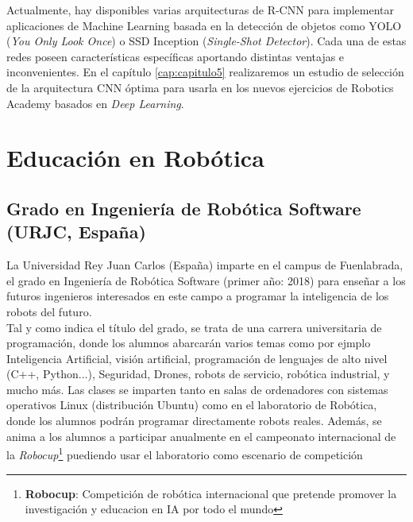 Actualmente, hay disponibles varias arquitecturas de R-CNN para implementar aplicaciones de Machine Learning basada en la detección de objetos como YOLO (\textit{You Only Look Once}) o SSD Inception (\textit{Single-Shot Detector}). Cada una de estas redes poseen características específicas aportando distintas ventajas e inconvenientes. En el capítulo \ref{cap:capitulo5} realizaremos un estudio de selección de la arquitectura CNN óptima para usarla en los nuevos ejercicios de Robotics Academy basados en \textit{Deep Learning}.


\section{Educación en Robótica}
\label{sec:educacion_robotica}

\subsection{Grado en Ingeniería de Robótica Software (URJC, España)}
\label{subsec:grado_robotica_software}
La Universidad Rey Juan Carlos (España) imparte en el campus de Fuenlabrada, el grado en Ingeniería de Robótica Software (primer año: 2018) para enseñar a los futuros ingenieros interesados en este campo a programar la inteligencia de los robots del futuro.\\

Tal y como indica el título del grado, se trata de una carrera universitaria de programación, donde los alumnos abarcarán varios temas como por ejmplo Inteligencia Artificial, visión artificial, programación de lenguajes de alto nivel (C++, Python...), Seguridad, Drones, robots de servicio, robótica industrial, y mucho más. Las clases se imparten tanto en salas de ordenadores con sistemas operativos Linux (distribución Ubuntu) como en el laboratorio de Robótica, donde los alumnos podrán programar directamente robots reales. Además, se anima a los alumnos a participar anualmente en el campeonato internacional de la \textit{Robocup}\footnote{\textbf{Robocup}: Competición de robótica internacional que pretende promover la investigación y educacion en IA por todo el mundo} puediendo usar el laboratorio como escenario de competición\\

